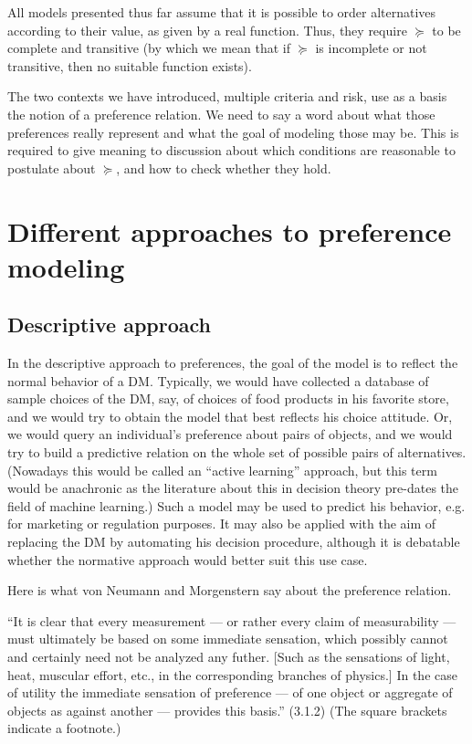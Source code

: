 \documentclass[french, english]{llncs}
\begin{document}
All models presented thus far assume that it is possible to order alternatives according to their value, as given by a real function. Thus, they require $\succeq$ to be complete and transitive (by which we mean that if $\succeq$ is incomplete or not transitive, then no suitable function exists).

The two contexts we have introduced, multiple criteria and risk, use as a basis the notion of a preference relation. We need to say a word about what those preferences really represent and what the goal of modeling those may be. This is required to give meaning to discussion about which conditions are reasonable to postulate about $\succeq$, and how to check whether they hold.

\section{Different approaches to preference modeling}
\subsection{Descriptive approach}
In the descriptive approach to preferences, the goal of the model is to reflect the normal behavior of a \ac{DM}. Typically, we would have collected a database of sample choices of the \ac{DM}, say, of choices of food products in his favorite store, and we would try to obtain the model that best reflects his choice attitude. Or, we would query an individual’s preference about pairs of objects, and we would try to build a predictive relation on the whole set of possible pairs of alternatives. (Nowadays this would be called an “active learning” approach, but this term would be anachronic as the literature about this in decision theory pre-dates the field of machine learning.) Such a model may be used to predict his behavior, e.g. for marketing or regulation purposes. It may also be applied with the aim of replacing the \ac{DM} by automating his decision procedure, although it is debatable whether the normative approach would better suit this use case.

Here is what von Neumann and Morgenstern say about the preference relation.

“It is clear that every measurement --- or rather every claim of measurability --- must ultimately be based on some immediate sensation, which possibly cannot and certainly need not be analyzed any futher.
[Such as the sensations of light, heat, muscular effort, etc., in the corresponding branches of physics.] 
In the case of utility the immediate sensation of preference --- of one object or aggregate of objects as against another --- provides this basis.” (3.1.2) (The square brackets indicate a footnote.)
\end{document}
